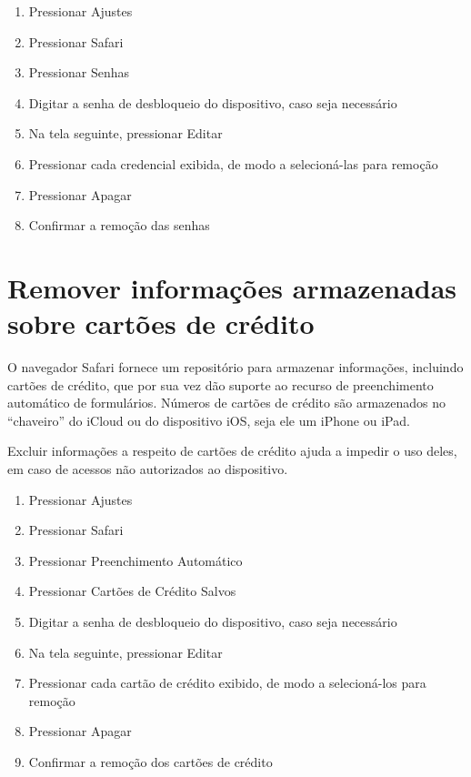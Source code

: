 \begin{enumerate}
\item Pressionar Ajustes
\item Pressionar Safari
\item Pressionar Senhas
\item Digitar a senha de desbloqueio do dispositivo, caso seja necess\'ario
\item Na tela seguinte, pressionar Editar
\item Pressionar cada credencial exibida, de modo a selecion\'a-las para remo\c c\~ao
\item Pressionar Apagar
\item Confirmar a remo\c c\~ao das senhas 
\end{enumerate}

\section{Remover informa\c c\~oes armazenadas sobre cart\~oes de cr\'edito}

O navegador Safari fornece um reposit\'orio para armazenar informa\c c\~oes, incluindo cart\~oes de cr\'edito, que por sua vez d\~ao suporte ao recurso de  preenchimento autom\'atico de formul\'arios. N\'umeros de cart\~oes de cr\'edito s\~ao armazenados no ``chaveiro'' do iCloud ou do dispositivo iOS, seja ele um iPhone ou iPad. 

Excluir informa\c c\~oes a respeito de cart\~oes de cr\'edito ajuda a impedir o uso deles, em caso de acessos n\~ao autorizados ao dispositivo.

\begin{enumerate}
\item Pressionar Ajustes
\item Pressionar Safari
\item Pressionar Preenchimento Autom\'atico
\item Pressionar Cart\~oes de Cr\'edito Salvos
\item Digitar a senha de desbloqueio do dispositivo, caso seja necess\'ario
\item Na tela seguinte, pressionar Editar
\item Pressionar cada cart\~ao de cr\'edito exibido, de modo a selecion\'a-los para remo\c c\~ao
\item Pressionar Apagar
\item Confirmar a remo\c c\~ao dos cart\~oes de cr\'edito 
\end{enumerate}	

